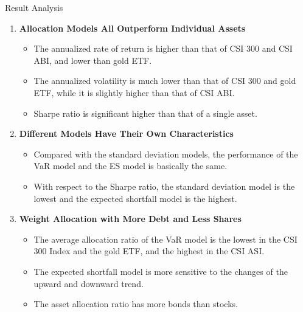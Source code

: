 \documentclass{beamer}
\begin{document}
\begin{frame}{Result Analysis}
\begin{enumerate}
    \item \textbf{Allocation Models All Outperform Individual Assets}
    \begin{itemize}
        \item The annualized rate of return is higher than that of CSI 300 and CSI ABI, and lower than gold ETF.
        \item The annualized volatility is much lower than that of CSI 300 and gold ETF, while it is slightly higher than that of CSI ABI.
        \item Sharpe ratio is significant higher than that of a single asset.
    \end{itemize}
    \item \textbf{Different Models Have Their Own Characteristics}
        \begin{itemize}
        \item Compared with the standard deviation models, the performance of the VaR model and the ES model is basically the same.
        \item With respect to the Sharpe ratio, the standard deviation model is the lowest and the expected shortfall model is the highest.
    \end{itemize}
    \item \textbf{Weight Allocation with More Debt and Less Shares}
        \begin{itemize}
        \item The average allocation ratio of the VaR model is the lowest in the CSI 300 Index and the gold ETF, and the highest in the CSI ASI.
        \item The expected shortfall model is more sensitive to the changes of the upward and downward trend.
        \item The asset allocation ratio has more bonds than stocks.
        \end{itemize}
\end{enumerate}
\end{frame}
\end{document}
